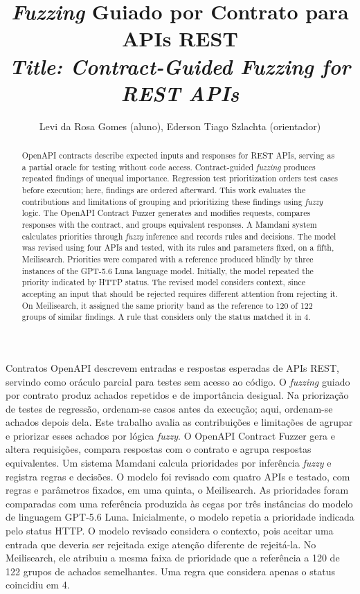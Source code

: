 \documentclass[12pt]{article}
\title{\textit{Fuzzing} Guiado por Contrato para APIs REST \\
\medskip
\small{
    \textit{Title: Contract-Guided Fuzzing for REST APIs}
  }
}
\author{Levi da Rosa Gomes (aluno)\inst{1}, Ederson Tiago Szlachta (orientador)\inst{1}}
\begin{document}
 
\maketitle

\thispagestyle{plain}

\pagestyle{plain2}

\begin{abstract}
OpenAPI contracts describe expected inputs and responses for REST APIs,
serving as a partial oracle for testing without code access. Contract-guided
\textit{fuzzing} produces repeated findings of unequal importance. Regression
test prioritization orders test cases before execution; here, findings are
ordered afterward. This work evaluates the contributions and limitations of grouping
and prioritizing these findings using \textit{fuzzy} logic. The OpenAPI
Contract Fuzzer generates and modifies requests, compares responses with the
contract, and groups equivalent responses. A Mamdani system calculates
priorities through \textit{fuzzy} inference and records rules and decisions.
The model was revised using four APIs and tested, with its rules and
parameters fixed, on a fifth, Meilisearch. Priorities were compared with a
reference produced blindly by three instances of the GPT-5.6 Luna language
model. Initially, the model repeated the priority indicated by HTTP status.
The revised model considers context, since accepting an input that should be
rejected requires different attention from rejecting it. On Meilisearch, it
assigned the same priority band as the reference to 120 of 122 groups of
similar findings. A rule that considers only the status matched it in 4.
\end{abstract}

     
\begin{resumo}
Contratos OpenAPI descrevem entradas e respostas esperadas de APIs REST,
servindo como oráculo parcial para testes sem acesso ao código. O
\textit{fuzzing} guiado por contrato produz achados repetidos e de
importância desigual. Na priorização de testes de regressão, ordenam-se
casos antes da execução; aqui, ordenam-se achados depois dela. Este trabalho
avalia as contribuições e limitações de agrupar e priorizar esses achados por lógica \textit{fuzzy}. O OpenAPI
Contract Fuzzer gera e altera requisições, compara respostas com o contrato
e agrupa respostas equivalentes. Um sistema Mamdani calcula prioridades por
inferência \textit{fuzzy} e registra regras e decisões. O modelo foi
revisado com quatro APIs e testado, com regras e parâmetros fixados, em uma
quinta, o Meilisearch. As prioridades foram comparadas com uma referência
produzida às cegas por três instâncias do modelo de linguagem GPT-5.6 Luna.
Inicialmente, o modelo repetia a prioridade indicada pelo status HTTP. O
modelo revisado considera o contexto, pois aceitar uma entrada que deveria
ser rejeitada exige atenção diferente de rejeitá-la. No Meilisearch, ele
atribuiu a mesma faixa de prioridade que a referência a 120 de 122 grupos
de achados semelhantes. Uma regra que considera apenas o status coincidiu
em 4.
\end{resumo}
\end{document}
